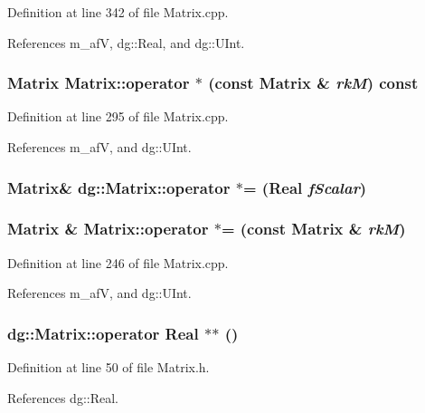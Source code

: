 Definition at line 342 of file Matrix.cpp.

References m\_\-af\-V, dg::Real, and dg::UInt.
\subsubsection{\setlength{\rightskip}{0pt plus 5cm}Matrix Matrix::operator $\ast$ (const Matrix \& {\em rk\-M}) const}\label{classdg_1_1Matrix_a17}




Definition at line 295 of file Matrix.cpp.

References m\_\-af\-V, and dg::UInt.
\subsubsection{\setlength{\rightskip}{0pt plus 5cm}Matrix\& dg::Matrix::operator $\ast$= ({\bf Real} {\em f\-Scalar})}\label{classdg_1_1Matrix_a24}


\subsubsection{\setlength{\rightskip}{0pt plus 5cm}Matrix \& Matrix::operator $\ast$= (const Matrix \& {\em rk\-M})}\label{classdg_1_1Matrix_a23}




Definition at line 246 of file Matrix.cpp.

References m\_\-af\-V, and dg::UInt.
\subsubsection{\setlength{\rightskip}{0pt plus 5cm}dg::Matrix::operator {\bf Real} $\ast$$\ast$ ()\hspace{0.3cm}{\tt  [inline]}}\label{classdg_1_1Matrix_a5}




Definition at line 50 of file Matrix.h.

References dg::Real.
